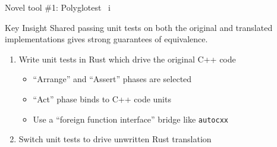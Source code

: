 \documentclass[10pt,aspectratio=169]{beamer}
\begin{document}
\begin{frame}{Novel tool \#1: Polyglotest \ i}
    \begin{alertblock}{Key Insight}
        \vspace*{0.25cm}
        Shared passing unit tests on both the original and translated implementations gives strong guarantees of equivalence.
    \end{alertblock}
    \vspace*{0.5cm}
    \begin{enumerate}
        \item<2-> Write unit tests in Rust which drive the original C++ code
        \begin{itemize}
            \item ``Arrange'' and ``Assert'' phases are selected
            \item ``Act'' phase binds to C++ code units
            \item Use a ``foreign function interface'' bridge like \texttt{autocxx}
        \end{itemize}
        \item<3-> Switch unit tests to drive unwritten Rust translation
    \end{enumerate}
    \vspace*{0.5cm}
\end{frame}
\end{document}
